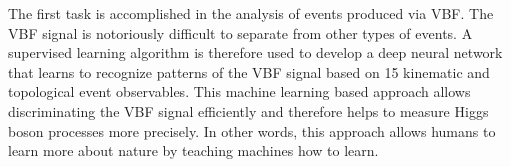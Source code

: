The first task is accomplished in the analysis of \HWWdet events produced via VBF.
The VBF signal is notoriously difficult to separate from other types of events. 
A supervised learning algorithm is therefore used to develop a deep neural network that learns to recognize patterns of the VBF signal based on 15 kinematic and topological event observables. 
This machine learning based approach allows discriminating the VBF signal efficiently and therefore helps to measure Higgs boson processes more precisely. 
In other words, this approach allows humans to learn more about nature by teaching machines how to learn. 







